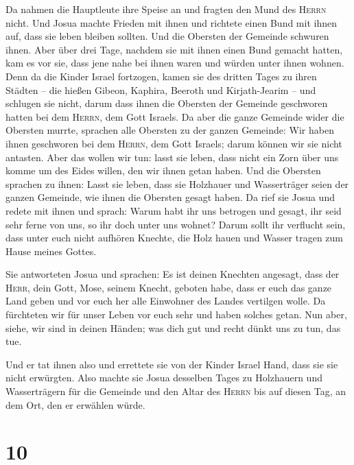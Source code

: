  Da nahmen die Hauptleute ihre Speise an und fragten den
Mund des \textsc{Herrn} nicht.  Und Josua machte Frieden
mit ihnen und richtete einen Bund mit ihnen auf, dass sie leben bleiben
sollten. Und die Obersten der Gemeinde schwuren ihnen. 
Aber über drei Tage, nachdem sie mit ihnen einen Bund gemacht hatten,
kam es vor sie, dass jene nahe bei ihnen waren und würden unter ihnen
wohnen.  Denn da die Kinder Israel fortzogen, kamen sie
des dritten Tages zu ihren Städten -- die hießen Gibeon, Kaphira,
Beeroth und Kirjath-Jearim --  und schlugen sie nicht,
darum dass ihnen die Obersten der Gemeinde geschworen hatten bei dem
\textsc{Herrn}, dem Gott Israels. Da aber die ganze Gemeinde wider die
Obersten murrte,  sprachen alle Obersten zu der ganzen
Gemeinde: Wir haben ihnen geschworen bei dem \textsc{Herrn}, dem Gott
Israels; darum können wir sie nicht antasten.  Aber das
wollen wir tun: lasst sie leben, dass nicht ein Zorn über uns komme um
des Eides willen, den wir ihnen getan haben.  Und die
Obersten sprachen zu ihnen: Lasst sie leben, dass sie Holzhauer und
Wasserträger seien der ganzen Gemeinde, wie ihnen die Obersten gesagt
haben.  Da rief sie Josua und redete mit ihnen und
sprach: Warum habt ihr uns betrogen und gesagt, ihr seid sehr ferne von
uns, so ihr doch unter uns wohnet?  Darum sollt ihr
verflucht sein, dass unter euch nicht aufhören Knechte, die Holz hauen
und Wasser tragen zum Hause meines Gottes.

 Sie antworteten Josua und sprachen: Es ist deinen
Knechten angesagt, dass der \textsc{Herr}, dein Gott, Mose, seinem
Knecht, geboten habe, dass er euch das ganze Land geben und vor euch her
alle Einwohner des Landes vertilgen wolle. Da fürchteten wir für unser
Leben vor euch sehr und haben solches getan.  Nun aber,
siehe, wir sind in deinen Händen; was dich gut und recht dünkt uns zu
tun, das tue.

 Und er tat ihnen also und errettete sie von der Kinder
Israel Hand, dass sie sie nicht erwürgten.  Also machte
sie Josua desselben Tages zu Holzhauern und Wasserträgern für die
Gemeinde und den Altar des \textsc{Herrn} bis auf diesen Tag, an dem
Ort, den er erwählen würde.

\hypertarget{section-9}{%
\section{10}\label{section-9}}

